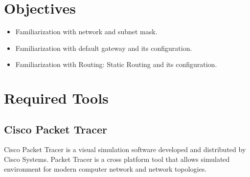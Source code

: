 \documentclass{lab_sheet}
\begin{document}
    \tableofcontents
    \pagebreak
    \listoffigures
    \pagebreak
    \listoftables
    \pagebreak
    \lstlistoflistings
    \pagebreak
    \section{Objectives}
    \begin{itemize}
        \item Familiarization with network and subnet mask.
        \item Familiarization with default gateway and its configuration.
        \item Familiarization with Routing: Static Routing and its configuration.
    \end{itemize}
    \section{Required Tools}
    \subsection{Cisco Packet Tracer}
    Cisco Packet Tracer is a visual simulation software developed and distributed by Cisco Systems. Packet Tracer is a cross platform tool that allows simulated environment for modern computer network and network topologies. 
\end{document}
